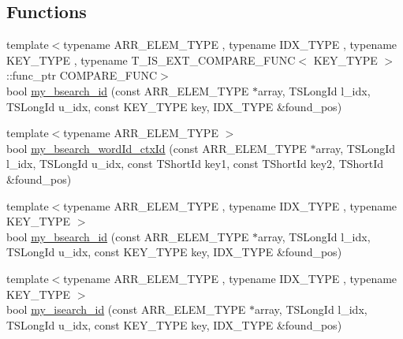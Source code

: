 \subsection*{Functions}
\begin{DoxyCompactItemize}
\item 
{\footnotesize template$<$typename A\+R\+R\+\_\+\+E\+L\+E\+M\+\_\+\+T\+Y\+P\+E , typename I\+D\+X\+\_\+\+T\+Y\+P\+E , typename K\+E\+Y\+\_\+\+T\+Y\+P\+E , typename T\+\_\+\+I\+S\+\_\+\+E\+X\+T\+\_\+\+C\+O\+M\+P\+A\+R\+E\+\_\+\+F\+U\+N\+C$<$ K\+E\+Y\+\_\+\+T\+Y\+P\+E $>$\+::func\+\_\+ptr C\+O\+M\+P\+A\+R\+E\+\_\+\+F\+U\+N\+C$>$ }\\bool \hyperlink{namespaceuva_1_1smt_1_1utils_1_1array_affeb6f6d61ece2d0624f00766eb46758}{my\+\_\+bsearch\+\_\+id} (const A\+R\+R\+\_\+\+E\+L\+E\+M\+\_\+\+T\+Y\+P\+E $\ast$array, T\+S\+Long\+Id l\+\_\+idx, T\+S\+Long\+Id u\+\_\+idx, const K\+E\+Y\+\_\+\+T\+Y\+P\+E key, I\+D\+X\+\_\+\+T\+Y\+P\+E \&found\+\_\+pos)
\item 
{\footnotesize template$<$typename A\+R\+R\+\_\+\+E\+L\+E\+M\+\_\+\+T\+Y\+P\+E $>$ }\\bool \hyperlink{namespaceuva_1_1smt_1_1utils_1_1array_a0920891dd342be4161a27c64f923fb14}{my\+\_\+bsearch\+\_\+word\+Id\+\_\+ctx\+Id} (const A\+R\+R\+\_\+\+E\+L\+E\+M\+\_\+\+T\+Y\+P\+E $\ast$array, T\+S\+Long\+Id l\+\_\+idx, T\+S\+Long\+Id u\+\_\+idx, const T\+Short\+Id key1, const T\+Short\+Id key2, T\+Short\+Id \&found\+\_\+pos)
\item 
{\footnotesize template$<$typename A\+R\+R\+\_\+\+E\+L\+E\+M\+\_\+\+T\+Y\+P\+E , typename I\+D\+X\+\_\+\+T\+Y\+P\+E , typename K\+E\+Y\+\_\+\+T\+Y\+P\+E $>$ }\\bool \hyperlink{namespaceuva_1_1smt_1_1utils_1_1array_a0cbe9d57fad5df035d7ea732d5d8e897}{my\+\_\+bsearch\+\_\+id} (const A\+R\+R\+\_\+\+E\+L\+E\+M\+\_\+\+T\+Y\+P\+E $\ast$array, T\+S\+Long\+Id l\+\_\+idx, T\+S\+Long\+Id u\+\_\+idx, const K\+E\+Y\+\_\+\+T\+Y\+P\+E key, I\+D\+X\+\_\+\+T\+Y\+P\+E \&found\+\_\+pos)
\item 
{\footnotesize template$<$typename A\+R\+R\+\_\+\+E\+L\+E\+M\+\_\+\+T\+Y\+P\+E , typename I\+D\+X\+\_\+\+T\+Y\+P\+E , typename K\+E\+Y\+\_\+\+T\+Y\+P\+E $>$ }\\bool \hyperlink{namespaceuva_1_1smt_1_1utils_1_1array_a6076438d9e556212f17764269292e28a}{my\+\_\+isearch\+\_\+id} (const A\+R\+R\+\_\+\+E\+L\+E\+M\+\_\+\+T\+Y\+P\+E $\ast$array, T\+S\+Long\+Id l\+\_\+idx, T\+S\+Long\+Id u\+\_\+idx, const K\+E\+Y\+\_\+\+T\+Y\+P\+E key, I\+D\+X\+\_\+\+T\+Y\+P\+E \&found\+\_\+pos)

\end{DoxyCompactItemize}
